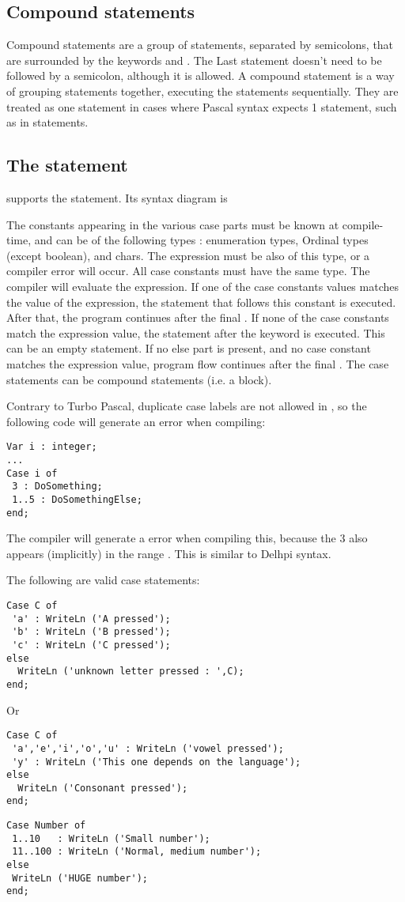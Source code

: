 \documentclass{report}
\begin{document}
\subsection{Compound statements}
Compound statements are a group of statements, separated by semicolons,
that are surrounded by the keywords  and . The
Last statement doesn't need to be followed by a semicolon, although it is
allowed. A compound statement is a way of grouping statements together,
executing the statements sequentially. They are treated as one statement
in cases where Pascal syntax expects 1 statement, such as in
 statements.

\subsection{The  statement}
\fpc supports the  statement. Its syntax diagram is

The constants appearing in the various case parts must be known at
compile-time, and can be of the following types : enumeration types,
Ordinal types (except boolean), and chars. The expression must be also of
this type, or a compiler error will occur. All case constants must
have the same type.
The compiler will evaluate the expression. If one of the case constants
values matches the value of the expression, the statement that follows
this constant is executed. After that, the program continues after the final
.
If none of the case constants match the expression value, the statement
after the  keyword is executed. This can be an empty statement.
If no else part is present, and no case constant matches the expression
value, program flow continues after the final .
The case statements can be compound statements
(i.e. a  block).

\begin{remark}
Contrary to Turbo Pascal, duplicate case labels are not
allowed in \fpc, so the following code will generate an error when
compiling:
\begin{verbatim}
Var i : integer;
...
Case i of
 3 : DoSomething;
 1..5 : DoSomethingElse;
end;
\end{verbatim}
The compiler will generate a  error when compiling
this, because the 3 also appears (implicitly) in the range . This
is similar to Delhpi syntax.
\end{remark}
The following are valid case statements:
\begin{verbatim}
Case C of
 'a' : WriteLn ('A pressed');
 'b' : WriteLn ('B pressed');
 'c' : WriteLn ('C pressed');
else
  WriteLn ('unknown letter pressed : ',C);
end;
\end{verbatim}
Or
\begin{verbatim}
Case C of
 'a','e','i','o','u' : WriteLn ('vowel pressed');
 'y' : WriteLn ('This one depends on the language');
else
  WriteLn ('Consonant pressed');
end;
\end{verbatim}
\begin{verbatim}
Case Number of
 1..10   : WriteLn ('Small number');
 11..100 : WriteLn ('Normal, medium number');
else
 WriteLn ('HUGE number');
end;
\end{verbatim}
\end{document}

